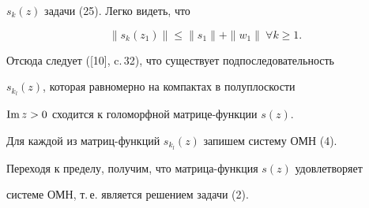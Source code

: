 \begin{pf}
$s_k(z)$ задачи (25). Легко видеть, что


$$


\|s_k(z_1)\| \leq \|s_1\|+\|w_1\|\ \forall k\geq 1.


$$


Отсюда следует ([10], c.\,32), что существует подпоследовательность


$s_{k_l}(z)$, которая равномерно на компактах в полуплоскости


$\operatorname{Im} z >0$ сходится к голоморфной матрице-функции $s(z)$.


Для каждой из матриц-функций $s_{k_l}(z)$ запишем систему ОМН (4).


Переходя к пределу, получим, что матрица-функция $s(z)$ удовлетворяет


системе ОМН, т.\,е. является решением задачи (2).


\end{pf}








